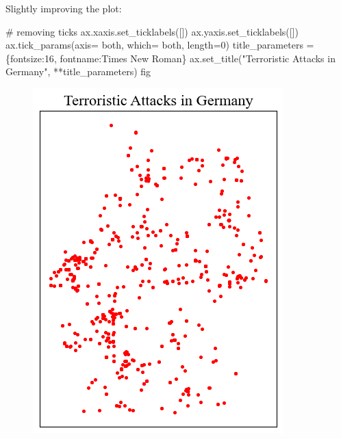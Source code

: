\documentclass[
  letterpaper,
  DIV=11,
  numbers=noendperiod]{scrreprt}
\newenvironment{Shaded}{\begin{snugshade}}{\end{snugshade}}
\newcommand{\CommentTok}[1]{\textcolor[rgb]{0.37,0.37,0.37}{#1}}
\newcommand{\DecValTok}[1]{\textcolor[rgb]{0.68,0.00,0.00}{#1}}
\newcommand{\NormalTok}[1]{\textcolor[rgb]{0.00,0.23,0.31}{#1}}
\newcommand{\OperatorTok}[1]{\textcolor[rgb]{0.37,0.37,0.37}{#1}}
\newcommand{\StringTok}[1]{\textcolor[rgb]{0.13,0.47,0.30}{#1}}
\begin{document}
Slightly improving the plot:

\begin{Shaded}
\begin{Highlighting}[]
\CommentTok{\# removing ticks}
\NormalTok{ax.xaxis.set\_ticklabels([])}
\NormalTok{ax.yaxis.set\_ticklabels([])}
\NormalTok{ax.tick\_params(axis}\OperatorTok{=} \StringTok{\textquotesingle{}both\textquotesingle{}}\NormalTok{, which}\OperatorTok{=} \StringTok{\textquotesingle{}both\textquotesingle{}}\NormalTok{, length}\OperatorTok{=}\DecValTok{0}\NormalTok{)}
\NormalTok{title\_parameters }\OperatorTok{=}\NormalTok{ \{}\StringTok{\textquotesingle{}fontsize\textquotesingle{}}\NormalTok{:}\StringTok{\textquotesingle{}16\textquotesingle{}}\NormalTok{, }\StringTok{\textquotesingle{}fontname\textquotesingle{}}\NormalTok{:}\StringTok{\textquotesingle{}Times New Roman\textquotesingle{}}\NormalTok{\}}
\NormalTok{ax.set\_title(}\StringTok{"Terroristic Attacks in Germany"}\NormalTok{, }\OperatorTok{**}\NormalTok{title\_parameters)}
\NormalTok{fig}
\end{Highlighting}
\end{Shaded}

\begin{figure}[H]

{\centering \includegraphics{labs/w02_maps_files/figure-pdf/cell-6-output-1.png}

}

\end{figure}
\end{document}
